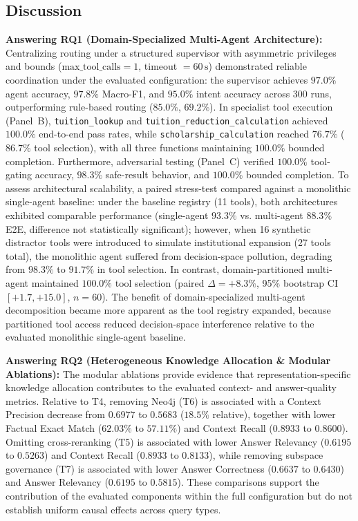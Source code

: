 \subsection{Discussion}
\label{sec:discussion}

\textbf{Answering RQ1 (Domain-Specialized Multi-Agent Architecture):} Centralizing routing under a structured supervisor with asymmetric privileges and bounds ($\text{max\_tool\_calls}=1$, timeout $=60\,\text{s}$) demonstrated reliable coordination under the evaluated configuration: the supervisor achieves $97.0\%$ agent accuracy, $97.8\%$ Macro-F1, and $95.0\%$ intent accuracy across 300 runs, outperforming rule-based routing ($85.0\%$, $69.2\%$). In specialist tool execution (Panel~B), \texttt{tuition\_lookup} and \texttt{tuition\_reduction\_calculation} achieved $100.0\%$ end-to-end pass rates, while \texttt{scholarship\_calculation} reached $76.7\%$ ($86.7\%$ tool selection), with all three functions maintaining $100.0\%$ bounded completion. Furthermore, adversarial testing (Panel~C) verified $100.0\%$ tool-gating accuracy, $98.3\%$ safe-result behavior, and $100.0\%$ bounded completion. To assess architectural scalability, a paired stress-test compared \system{} against a monolithic single-agent baseline: under the baseline registry (11 tools), both architectures exhibited comparable performance (single-agent $93.3\%$ vs. multi-agent $88.3\%$ E2E, difference not statistically significant); however, when 16 synthetic distractor tools were introduced to simulate institutional expansion (27 tools total), the monolithic agent suffered from decision-space pollution, degrading from $98.3\%$ to $91.7\%$ in tool selection. In contrast, domain-partitioned multi-agent maintained $100.0\%$ tool selection (paired $\Delta = +8.3\%$, 95\% bootstrap CI $[+1.7, +15.0]$, $n=60$). The benefit of domain-specialized multi-agent decomposition became more apparent as the tool registry expanded, because partitioned tool access reduced decision-space interference relative to the evaluated monolithic single-agent baseline.

\textbf{Answering RQ2 (Heterogeneous Knowledge Allocation \& Modular Ablations):} The modular ablations provide evidence that representation-specific knowledge allocation contributes to the evaluated context- and answer-quality metrics. Relative to T4, removing Neo4j (T6) is associated with a Context Precision decrease from $0.6977$ to $0.5683$ ($18.5\%$ relative), together with lower Factual Exact Match ($62.03\%$ to $57.11\%$) and Context Recall ($0.8933$ to $0.8600$). Omitting cross-reranking (T5) is associated with lower Answer Relevancy ($0.6195$ to $0.5263$) and Context Recall ($0.8933$ to $0.8133$), while removing subspace governance (T7) is associated with lower Answer Correctness ($0.6637$ to $0.6430$) and Answer Relevancy ($0.6195$ to $0.5815$). These comparisons support the contribution of the evaluated components within the full configuration but do not establish uniform causal effects across query types.

